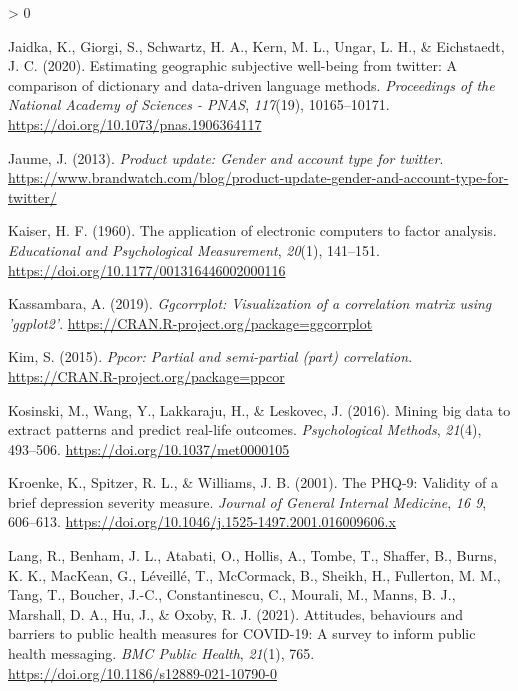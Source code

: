 \documentclass[
  english,
  jou,floatsintext]{apa7}
\newlength{\cslhangindent}
\newenvironment{CSLReferences}[2] %
 {%
  \setlength{\parindent}{0pt}
  \ifodd #1 \everypar{\setlength{\hangindent}{\cslhangindent}}\ignorespaces\fi
  \ifnum #2 > 0
  \setlength{\parskip}{#2\baselineskip}
  \fi
 }%
 {}
\begin{document}
\begin{CSLReferences}{1}{0}
\leavevmode\hypertarget{ref-Jaidka2020}{}%
Jaidka, K., Giorgi, S., Schwartz, H. A., Kern, M. L., Ungar, L. H., \& Eichstaedt, J. C. (2020). Estimating geographic subjective well-being from twitter: A comparison of dictionary and data-driven language methods. \emph{Proceedings of the National Academy of Sciences - PNAS}, \emph{117}(19), 10165--10171. \url{https://doi.org/10.1073/pnas.1906364117}

\leavevmode\hypertarget{ref-jaume_2013}{}%
Jaume, J. (2013). \emph{Product update: Gender and account type for twitter}. \url{https://www.brandwatch.com/blog/product-update-gender-and-account-type-for-twitter/}

\leavevmode\hypertarget{ref-Kaiser1960}{}%
Kaiser, H. F. (1960). The application of electronic computers to factor analysis. \emph{Educational and Psychological Measurement}, \emph{20}(1), 141--151. \url{https://doi.org/10.1177/001316446002000116}

\leavevmode\hypertarget{ref-R-ggcorrplot}{}%
Kassambara, A. (2019). \emph{Ggcorrplot: Visualization of a correlation matrix using 'ggplot2'}. \url{https://CRAN.R-project.org/package=ggcorrplot}

\leavevmode\hypertarget{ref-R-ppcor}{}%
Kim, S. (2015). \emph{Ppcor: Partial and semi-partial (part) correlation}. \url{https://CRAN.R-project.org/package=ppcor}

\leavevmode\hypertarget{ref-Kosinski2016}{}%
Kosinski, M., Wang, Y., Lakkaraju, H., \& Leskovec, J. (2016). Mining big data to extract patterns and predict real-life outcomes. \emph{Psychological Methods}, \emph{21}(4), 493--506. \url{https://doi.org/10.1037/met0000105}

\leavevmode\hypertarget{ref-Kroenke2001}{}%
Kroenke, K., Spitzer, R. L., \& Williams, J. B. (2001). The PHQ-9: Validity of a brief depression severity measure. \emph{Journal of General Internal Medicine}, \emph{16 9}, 606--613. \url{https://doi.org/10.1046/j.1525-1497.2001.016009606.x}

\leavevmode\hypertarget{ref-lang2021}{}%
Lang, R., Benham, J. L., Atabati, O., Hollis, A., Tombe, T., Shaffer, B., Burns, K. K., MacKean, G., Léveillé, T., McCormack, B., Sheikh, H., Fullerton, M. M., Tang, T., Boucher, J.-C., Constantinescu, C., Mourali, M., Manns, B. J., Marshall, D. A., Hu, J., \& Oxoby, R. J. (2021). Attitudes, behaviours and barriers to public health measures for {COVID}-19: A survey to inform public health messaging. \emph{{BMC} Public Health}, \emph{21}(1), 765. \url{https://doi.org/10.1186/s12889-021-10790-0}


\end{CSLReferences}
\end{document}
